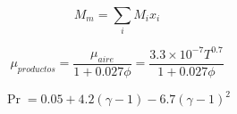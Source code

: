\begin{equation}\label{eq:mw}
  M_{m} = \sum_{i} M_{i}x_{i}
\end{equation}

\begin{equation}\label{eq:mu}
  \mu_{productos} = \frac{\mu_{aire}} {1 + 0.027 \phi} = \frac{3.3\times 10^{-7} T^{0.7}} {1 + 0.027 \phi}
\end{equation}

\begin{equation}\label{eq:pr}
    \Pr = 0.05 + 4.2 (\gamma - 1) - 6.7 {(\gamma - 1)}^{2}
\end{equation}
